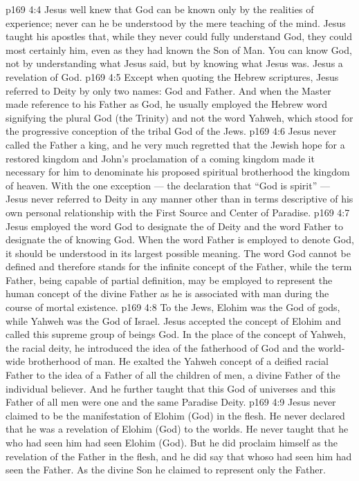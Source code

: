 \vs p169 4:4 Jesus well knew that God can be known only by the realities of experience; never can he be understood by the mere teaching of the mind. Jesus taught his apostles that, while they never could fully understand God, they could most certainly  him, even as they had known the Son of Man. You can know God, not by understanding what Jesus said, but by knowing what Jesus was. Jesus  a revelation of God.
\vs p169 4:5 \pc Except when quoting the Hebrew scriptures, Jesus referred to Deity by only two names: God and Father. And when the Master made reference to his Father as God, he usually employed the Hebrew word signifying the plural God (the Trinity) and not the word Yahweh, which stood for the progressive conception of the tribal God of the Jews.
\vs p169 4:6 Jesus never called the Father a king, and he very much regretted that the Jewish hope for a restored kingdom and John’s proclamation of a coming kingdom made it necessary for him to denominate his proposed spiritual brotherhood the kingdom of heaven. With the one exception --- the declaration that \textcolor{ubdarkred}{“God is spirit”} --- Jesus never referred to Deity in any manner other than in terms descriptive of his own personal relationship with the First Source and Center of Paradise.
\vs p169 4:7 Jesus employed the word God to designate the  of Deity and the word Father to designate the  of knowing God. When the word Father is employed to denote God, it should be understood in its largest possible meaning. The word God cannot be defined and therefore stands for the infinite concept of the Father, while the term Father, being capable of partial definition, may be employed to represent the human concept of the divine Father as he is associated with man during the course of mortal existence.
\vs p169 4:8 To the Jews, Elohim was the God of gods, while Yahweh was the God of Israel. Jesus accepted the concept of Elohim and called this supreme group of beings God. In the place of the concept of Yahweh, the racial deity, he introduced the idea of the fatherhood of God and the world\hyp{}wide brotherhood of man. He exalted the Yahweh concept of a deified racial Father to the idea of a Father of all the children of men, a divine Father of the individual believer. And he further taught that this God of universes and this Father of all men were one and the same Paradise Deity.
\vs p169 4:9 Jesus never claimed to be the manifestation of Elohim (God) in the flesh. He never declared that he was a revelation of Elohim (God) to the worlds. He never taught that he who had seen him had seen Elohim (God). But he did proclaim himself as the revelation of the Father in the flesh, and he did say that whoso had seen him had seen the Father. As the divine Son he claimed to represent only the Father.
